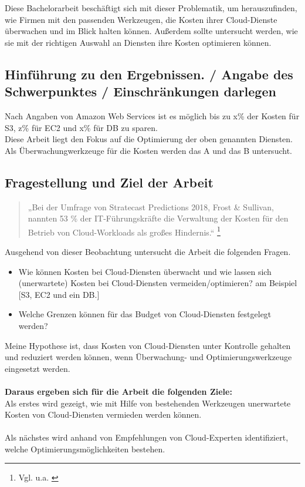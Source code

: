 Diese Bachelorarbeit beschäftigt sich mit dieser Problematik, um herauszufinden, wie Firmen mit den passenden Werkzeugen, die Kosten ihrer Cloud-Dienste überwachen und im Blick halten können. Außerdem sollte untersucht werden, wie sie mit der richtigen Auswahl an Diensten ihre Kosten optimieren können.
\newpage

\subsection{Hinführung zu den Ergebnissen. / Angabe des Schwerpunktes / Einschränkungen darlegen}
Nach Angaben von Amazon Web Services ist es möglich bis zu x\% der Kosten für S3, z\% für EC2 und x\% für DB zu sparen.
\\
Diese Arbeit liegt den Fokus auf die Optimierung der oben genannten Diensten.
Als Überwachungwerkzeuge für die Kosten werden das A und das B untersucht. 
\\
\subsection{Fragestellung und Ziel der Arbeit}
\begin{quote}
„Bei der Umfrage von Stratecast Predictions 2018, Frost \& Sullivan, nannten 53 \% der IT-Führungskräfte die Verwaltung der Kosten für den Betrieb von Cloud-Workloads als großes Hindernis.“  
\footnote{Vgl. u.a. \cite{SP1}}
\end{quote}
Ausgehend von dieser Beobachtung untersucht die Arbeit die folgenden Fragen. 
\begin{itemize}
    \item
        Wie können Kosten bei Cloud-Diensten überwacht und wie lassen sich (unerwartete) Kosten bei Cloud-Diensten vermeiden/optimieren? am Beispiel [S3, EC2 und ein DB.]
    \item
        Welche Grenzen können für das Budget von Cloud-Diensten festgelegt werden?
\end{itemize}
Meine Hypothese ist, dass Kosten von Cloud-Diensten unter Kontrolle gehalten und
reduziert werden können, wenn Überwachung- und Optimierungswerkzeuge eingesetzt werden.
\\\\
\textbf{Daraus ergeben sich für die Arbeit die folgenden Ziele:}\\ 
Als erstes wird gezeigt, wie mit Hilfe von bestehenden Werkzeugen unerwartete Kosten von Cloud-Diensten vermieden werden können.\\\\
Als nächstes wird anhand von Empfehlungen von Cloud-Experten identifiziert, welche Optimierungsmöglichkeiten bestehen.\\
\newpage
